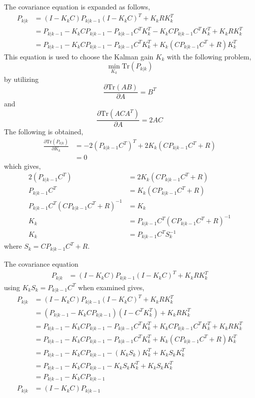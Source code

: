 \documentclass{article}
\begin{document}
The covariance equation is expanded as follows,
\begin{align}
    P_{k|k} &=(I-K_k C) P_{k|k-1} (I-K_k C)^T+K_k R K_k^T\\
    &=P_{k|k-1}-K_k C P_{k|k-1}-P_{k|k-1} C^T K_k^T-K_k C P_{k|k-1} C^T K_k^T+K_k R K_k^T\\
    &=P_{k|k-1}-K_k C P_{k|k-1}-P_{k|k-1} C^T K_k^T+K_k (C P_{k|k-1} C^T+R) K_k^T
\end{align}
This equation is used to choose the Kalman gain $K_k$ with the following problem,
\begin{equation}
    \min_{K_k} \text{Tr}(P_{k|k})
\end{equation}
by utilizing 
\begin{equation}
    \frac{\partial \text{Tr}(AB)}{\partial A} = B^T
\end{equation}
and
\begin{equation}
    \frac{\partial \text{Tr}(ACA^T)}{\partial A} = 2AC
\end{equation}
The following is obtained,
\begin{align}
    \frac{\partial \text{Tr}(P_{k|k})}{\partial K_k} &= -2 \left( P_{k|k-1} C^T \right)^T + 2 K_k \left( C P_{k|k-1} C^T + R \right)\\
    &=0
\end{align}
which gives,
\begin{align}
    2 \left( P_{k|k-1} C^T \right) &= 2 K_k \left( C P_{k|k-1} C^T + R \right)\\
    P_{k|k-1} C^T  &= K_k (C P_{k|k-1} C^T + R) \\
    P_{k|k-1} C^T(C P_{k|k-1} C^T + R)^{-1}  &= K_k \\
    K_k&= P_{k|k-1} C^T(C P_{k|k-1} C^T + R)^{-1}\\
    K_k&= P_{k|k-1} C^T S_k^{-1}
\end{align}
where $S_k = C P_{k|k-1}C^T+R$.

The covariance equation 
\begin{align}
    P_{k|k} &=(I-K_k C) P_{k|k-1} (I-K_k C)^T+K_k R K_k^T
\end{align}
using $K_k S_k=P_{k|k-1} C^T$ when examined gives,
\begin{align}
    P_{k|k} &=(I-K_k C) P_{k|k-1} (I-K_k C)^T+K_k R K_k^T\\
    &=(P_{k|k-1} -K_k C P_{k|k-1} )(I-C^T K_k^T)+K_k R K_k^T\\
    &=P_{k|k-1}-K_k C P_{k|k-1}-P_{k|k-1}C^T K_k^T+K_k C P_{k|k-1}C^T K_k^T+K_k R K_k^T\\
    &=P_{k|k-1}-K_k C P_{k|k-1}-P_{k|k-1}C^T K_k^T+K_k (C P_{k|k-1}C^T+R) K_k^T\\
    &=P_{k|k-1}-K_k C P_{k|k-1}-(K_k S_k) K_k^T+K_k S_k K_k^T\\
    &=P_{k|k-1}-K_k C P_{k|k-1}-K_k S_k K_k^T+K_k S_k K_k^T\\
    &=P_{k|k-1}-K_k C P_{k|k-1}\\
    P_{k|k} &=(I-K_k C) P_{k|k-1}
\end{align}
\end{document}
